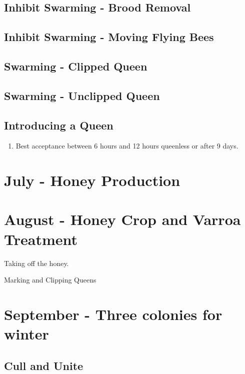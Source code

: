 \documentclass{./BeekeepingBook}
\begin{document}
\subsection{Inhibit Swarming - Brood Removal}

\subsection{Inhibit Swarming - Moving Flying Bees}

\subsection{Swarming - Clipped Queen}

\subsection{Swarming - Unclipped Queen}

\subsection{Introducing a Queen}
 
 \begin{enumerate}
	\item{Best acceptance between 6 hours and 12 hours queenless or after 9 days.}
\end{enumerate}
 
 
 
\section{July - Honey Production}


 
\section{August - Honey Crop and Varroa Treatment}

Taking off the honey.

Marking and Clipping Queens


\section{September - Three colonies for winter}

\subsection{Cull and Unite}
\end{document}
